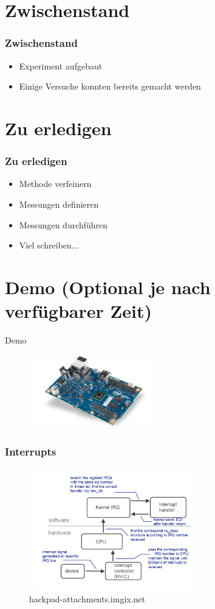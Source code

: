 \documentclass{beamer}
\begin{document}
\section{Zwischenstand}
\begin{frame}
\frametitle {Zwischenstand}
\begin{itemize}
 \item Experiment aufgebaut
 \item Einige Versuche konnten bereits gemacht werden
\end{itemize}
\end{frame}

\section{Zu erledigen}
\begin{frame}
\frametitle{Zu erledigen}
\begin{itemize}
 \item Methode verfeinern
 \item Messungen definieren
 \item Messungen durchführen
 \item Viel schreiben...
\end{itemize}

\end{frame}


\section{Demo (Optional je nach verfügbarer Zeit)} 
\begin{frame}
\Huge Demo

\begin{figure}
  \includegraphics[width=200px,height=120px]{iot_galileo.png}
\end{figure}	

\end{frame}



 
\begin{frame}
\frametitle{Interrupts}
\begin{figure}
  \includegraphics[width=280px,height=200px]{interrupt_view.png}
     \caption{hackpad-attachments.imgix.net}
\end{figure}	
\end{frame}
\end{document}
